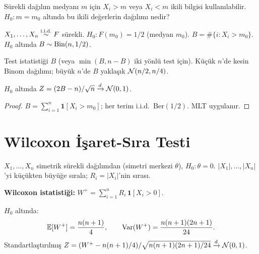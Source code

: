 \begin{kesif}
Sürekli dağılım medyanı $m$ için $X_i>m$ veya $X_i<m$ ikili bilgisi kullanılabilir. $H_0:m=m_0$ altında bu ikili değerlerin dağılımı nedir?
\end{kesif}

\begin{tanim}\label{def:isaret_testi}
$X_1,\ldots,X_n\overset{\text{i.i.d.}}{\sim} F$ sürekli. $H_0: F(m_0)=1/2$ (medyan $m_0$). $B = \#\{i:X_i>m_0\}$. $H_0$ altında $B\sim\operatorname{Bin}(n,1/2)$.

Test istatistiği $B$ (veya $\min(B,n-B)$ iki yönlü test için). Küçük $n$'de kesin Binom dağılımı; büyük $n$'de $B$ yaklaşık $\mathcal{N}(n/2,n/4)$.
\end{tanim}

\begin{teorem}
$H_0$ altında $Z=(2B-n)/\sqrt{n}\xrightarrow{d}\mathcal{N}(0,1)$.
\end{teorem}

\begin{proof}
$B=\sum_{i=1}^n\mathbf{1}[X_i>m_0]$; her terim i.i.d.\ $\mathrm{Ber}(1/2)$. MLT uygulanır.
\end{proof}

\section{Wilcoxon İşaret-Sıra Testi}
\label{sec:wilcoxon_isaret}

\begin{tanim}\label{def:wilcoxon_isaret}
$X_1,\ldots,X_n$ simetrik sürekli dağılımdan (simetri merkezi $\theta$), $H_0:\theta=0$. $|X_1|,\ldots,|X_n|$'yi küçükten büyüğe sırala; $R_i = |X_i|$'nin sırası.

\textbf{Wilcoxon istatistiği:} $W^+ = \sum_{i=1}^n R_i\,\mathbf{1}[X_i>0]$.
\end{tanim}

\begin{teorem}\label{thm:wilcoxon_asimptotik}
$H_0$ altında:
\[
  \mathbb{E}[W^+] = \frac{n(n+1)}{4}, \qquad \operatorname{Var}(W^+) = \frac{n(n+1)(2n+1)}{24}.
\]
Standartlaştırılmış $Z = (W^+ - n(n+1)/4)/\sqrt{n(n+1)(2n+1)/24} \xrightarrow{d} \mathcal{N}(0,1)$.
\end{teorem}

